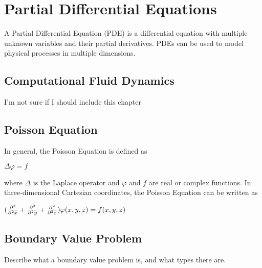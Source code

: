 \section*{Partial Differential Equations}

A Partial Differential Equation (PDE) is a differential equation with multiple 
unknown variables and their partial derivatives. PDEs can be used to model physical 
processes in multiple dimensions. 

\subsection*{Computational Fluid Dynamics}

I'm not sure if I should include this chapter

\subsection*{Poisson Equation}

In general, the Poisson Equation is defined as 

$\Delta \varphi = f$

where $\Delta$ is the Laplace operator and $\varphi$ and $f$ are real or complex 
functions. In three-dimensional Cartesian coordinates, the Poisson Equation can 
be written as 

$(\frac{\partial^2}{\partial^2 x} + \frac{\partial^2}{\partial^2 y} + \frac{\partial^2}{\partial^2 z}) \varphi (x, y, z) = f(x, y, z)$

\subsection*{Boundary Value Problem}

Describe what a boundary value problem is, and what types there are.

